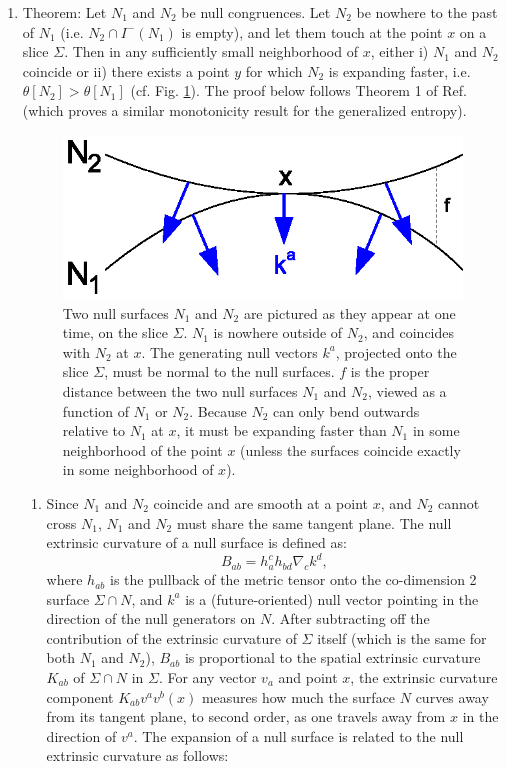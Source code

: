 \documentclass{article}
\begin{document}
\begin{enumerate}
\item \label{thetaineq} Theorem: Let $N_1$ and $N_2$ be null congruences.  Let $N_2$ be nowhere to the past of $N_1$
(i.e. $N_2 \cap I^-(N_1)$ is empty), and let them touch at the point $x$ on a slice $\Sigma$.  Then in any sufficiently small neighborhood of $x$, either i) $N_1$ and $N_2$ coincide or ii) there exists a point $y$ for which $N_2$ is expanding faster, i.e. $\theta[N_2] > \theta[N_1]$ (cf. Fig. \ref{bend}).  The proof below follows Theorem 1 of Ref. \cite{sing} (which proves a similar monotonicity result for the generalized entropy).
\begin{figure}[hbt]
\centering
\includegraphics[width=.4\textwidth]{bend.eps}
\caption{\footnotesize Two null surfaces $N_1$ and $N_2$ are pictured as they appear at one time, on the slice $\Sigma$.  $N_1$ is nowhere outside of $N_2$, and coincides with $N_2$ at $x$.  The generating null vectors $k^a$, projected onto the slice $\Sigma$, must be normal to the null surfaces.  $f$ is the proper distance between the two null surfaces $N_1$ and $N_2$, viewed as a function of $N_1$ or $N_2$.  Because $N_2$ can only bend outwards relative to $N_1$ at $x$, it must be expanding faster than $N_1$ in some neighborhood of the point $x$ (unless the surfaces coincide exactly in some neighborhood of $x$).}\label{bend}
\end{figure}
	\begin{enumerate}
	\item Since $N_1$ and $N_2$ coincide and are smooth at a point $x$, and $N_2$ cannot cross $N_1$, $N_1$ and $N_2$ must share the same tangent plane.  The null extrinsic curvature of a null surface is defined as:
\begin{equation}\label{B}
B_{ab} = h^c_a h_{bd} \nabla_c k^d,
\end{equation} 
where $h_{ab}$ is the pullback of the metric tensor onto the co-dimension 2 surface $\Sigma \cap N$, and $k^a$ is a (future-oriented) null vector pointing in the direction of the null generators on $N$.  After subtracting off the contribution of the extrinsic curvature of $\Sigma$ itself (which is the same for both $N_1$ and $N_2$), $B_{ab}$ is proportional to the spatial extrinsic curvature $K_{ab}$ of $\Sigma \cap N$ in $\Sigma$.  For any vector $v_a$ and point $x$, the extrinsic curvature component $K_{ab} v^a v^b (x)$ measures how much the surface $N$ curves away from its tangent plane, to second order, as one travels away from $x$ in the direction of $v^a$.  The expansion of a null surface is related to the null extrinsic curvature as follows:

\end{enumerate}
\end{enumerate}
\end{document}
